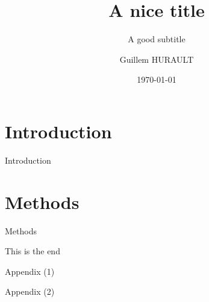 \documentclass[10pt]{beamer}
\title{A nice title}
\subtitle{A good subtitle}
\date{\today}
\author{Guillem HURAULT}
\begin{document}
\maketitle

\section{Introduction}

\begin{frame}{Introduction}

\end{frame}

\section{Methods}

\begin{frame}{Methods}

\end{frame}

\begin{frame}[standout]

This is the end

\end{frame}

\appendix

\begin{frame}{Appendix (1)}
    
\end{frame}

\begin{frame}{Appendix (2)}
    
\end{frame}
\end{document}
